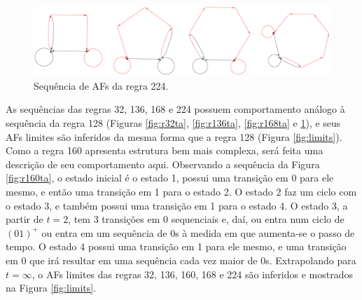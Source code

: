 \documentclass[12pt,a4paper]{article}
\begin{document}
\begin{figure}[H]
\begin{center}
\includegraphics[scale=0.47]{img/Rule224dfa.eps}
\caption{Sequência de AFs da regra 224.}
\label{fig:r224ta}
\end{center}
\end{figure}

As sequências das regras 32, 136, 168 e 224 possuem comportamento análogo à
sequência da regra 128 (Figuras \ref{fig:r32ta}, \ref{fig:r136ta}, \ref{fig:r168ta}
e \ref{fig:r224ta}), e seus AFs limites são inferidos da mesma forma que a regra 128 (Figura \ref{fig:limits}).
Como a regra 160 apresenta estrutura bem mais complexa, será feita uma descrição
de seu comportamento aqui. Observando a sequência da Figura
\ref{fig:r160ta}, o estado inicial é o estado 1, possui uma transição em 0 para ele mesmo, e então
uma transição em 1 para o estado 2. O estado 2 faz um ciclo com o estado 3, e também possui uma
transição em 1 para o estado 4. O estado 3, a partir de $t=2$, tem 3 transições em 0 sequenciais
e, daí, ou entra num ciclo de $(01)^+$ ou entra em um sequência de 0s à medida em que aumenta-se o
passo de tempo. O estado 4 possui uma transição em 1 para ele mesmo, e uma transição em 0 que
irá resultar em uma sequência cada vez maior de 0s. Extrapolando para $t=\infty$,
o AFs limites das regras 32, 136, 160, 168 e 224 são inferidos e mostrados na Figura
\ref{fig:limits}.
\end{document}
